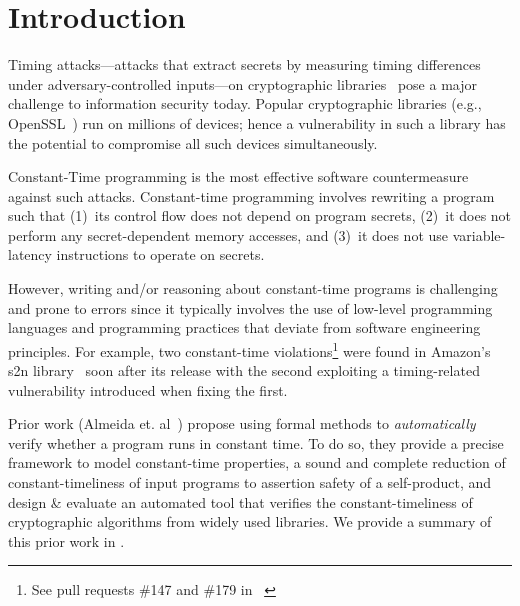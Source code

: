\section{Introduction}

Timing attacks---attacks that extract secrets by measuring timing differences under adversary-controlled inputs---on cryptographic libraries~\cite{bernstein_cache_timing_attacks, dsa_exponentiations} pose a major challenge to information security today.
Popular cryptographic libraries (e.g., OpenSSL~\cite{openssl}) run on millions of devices; hence a vulnerability in such a library has the potential to compromise all such devices simultaneously.

Constant-Time programming is the most effective software countermeasure against such attacks.
Constant-time programming involves rewriting a program such that (1)~its control flow does not depend on program secrets, (2)~it does not perform any secret-dependent memory accesses, and (3)~it does not use variable-latency instructions to operate on secrets.

However, writing and/or reasoning about constant-time programs is challenging and prone to errors since it typically involves the use of low-level programming languages and programming practices that deviate from software engineering principles.
For example, two constant-time violations\footnote{See pull requests \#147 and \#179 in ~\cite{s2n}} were found in Amazon's s2n library~\cite{s2n} soon after its release with the second exploiting a timing-related vulnerability introduced when fixing the first.

Prior work (Almeida et. al~\cite{almeida}) propose using formal methods to \emph{automatically} verify whether a program runs in constant time.
To do so, they provide a precise framework to model constant-time properties, a sound and complete reduction of constant-timeliness of input programs to assertion safety of a self-product, and design \& evaluate an automated tool that verifies the constant-timeliness of cryptographic algorithms from widely used libraries.
We provide a summary of this prior work in .

